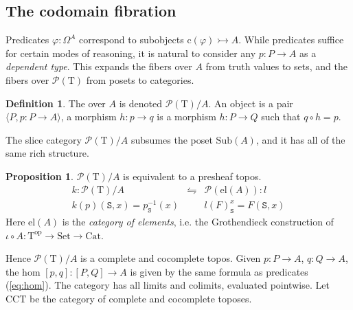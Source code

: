 \documentclass[conference]{IEEEtran}
\theoremstyle{definition}
\newtheorem{definition}[theorem]{Definition}
\newtheorem{example}[theorem]{Example}
\newtheorem{proposition}[theorem]{Proposition}
\newcommand{\define}[1]{{\bf \boldmath{#1}}}
\newcommand{\msc}[1]{\mathscr{#1}}
\newcommand{\mrm}[1]{\mathrm{#1}}
\newcommand{\mtt}[1]{\mathtt{#1}}
\newcommand{\rtail}{\rightarrowtail}
\newcommand{\ra}{\Rightarrow}
\newcommand{\op}{\mrm{op}}
\newcommand{\lrh}{\leftrightharpoons}
\newcommand{\T}{\mrm{T}}
\newcommand{\Set}{\mrm{Set}}
\newcommand{\Cat}{\mrm{Cat}}
\newcommand{\Sub}{\mrm{Sub}}
\newcommand{\pow}{\msc{P}}
\newcommand{\ttr}{\mtt{R}}
\newcommand{\tts}{\mtt{S}}
\begin{document}
\subsection{The codomain fibration}
\label{ssec:cod}

Predicates $\varphi:\Omega^A$ correspond to subobjects $\mrm{c}(\varphi)\rtail A$. While predicates suffice for certain modes of reasoning, it is natural to consider any $p:P\to A$ as a \textit{dependent type}. This expands the fibers over $A$ from truth values to sets, and the fibers over $\pow(\T)$ from posets to categories.



\begin{definition}
    The \define{slice category} over $A$ is denoted $\pow(\T)/A$. An object is a pair $\langle P,p:P\to A\rangle$, a morphism $h:p\to q$ is a morphism $h:P\to Q$ such that $q\circ h= p$.
\end{definition}

The slice category $\pow(\T)/A$ subsumes the poset $\Sub(A)$, and it has all of the same rich structure.

\begin{proposition}
    $\pow(\T)/A$ is equivalent to a presheaf topos.
    \[\begin{array}{rcl}
         k:\pow(\T)/A &\lrh & \pow(\mrm{el}(A)):l\\
         k(p)(\tts,x) = p_\tts^{-1}(x) & & l(F)_\tts^x = F(\tts,x)
    \end{array}\]
    Here $\mrm{el}(A)$ is the \textit{category of elements}, i.e. the Grothendieck construction of $\iota\circ A:\T^\op\to \Set\to \Cat$. \cite{sheavesinGL}
\end{proposition}

Hence $\pow(\T)/A$ is a complete and cocomplete topos. Given $p:P\to A$, $q:Q\to A$, the hom $[p,q]:[P,Q]\to A$ is given by the same formula as predicates (\ref{eq:hom}). The category has all limits and colimits, evaluated pointwise. Let $\mrm{CCT}$ be the category of complete and cocomplete toposes.
\end{document}
